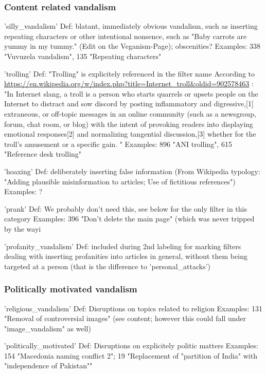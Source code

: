 \subsubsection{Content related vandalism}

'silly\_vandalism'
  Def: blatant, immediately obvious vandalism, such as inserting repeating characters or other intentional nonsence, such as "Baby carrots are yummy in my tummy." (Edit on the Veganism-Page); obscenities? %
  Examples: 338 "Vuvuzela vandalism", 135 "Repeating characters"

'trolling'
  Def: "Trolling" is explicitely referenced in the filter name %
  According to \url{https://en.wikipedia.org/w/index.php?title=Internet_troll&oldid=902578463} :
  "In Internet slang, a troll is a person who starts quarrels or upsets people on the Internet to distract and sow discord by posting inflammatory and digressive,[1] extraneous, or off-topic messages in an online community (such as a newsgroup, forum, chat room, or blog) with the intent of provoking readers into displaying emotional responses[2] and normalizing tangential discussion,[3] whether for the troll's amusement or a specific gain. "
  Examples: 896 "ANI trolling", 615 "Reference desk trolling"

'hoaxing'
  Def: deliberately inserting false information (From Wikipedia typology: "Adding plausible misinformation to articles; Use of fictitious references")
  Examples: ?

'prank'
  Def: We probably don't need this, see below for the only filter in this category
  Examples: 396 "Don't delete the main page" (which was never tripped by the way^^)

'profanity\_vandalism'
  Def: included during 2nd labeling for marking filters dealing with inserting profanities into articles in general, without them being targeted at a person (that is the difference to 'personal\_attacks')

\subsubsection{Politically motivated vandalism}
'religious\_vandalism'
Def: Disruptions on topics related to religion
Examples: 131 "Removal of controversial images" (see content; however this could fall under "image\_vandalism" as well)

'politically\_motivated'
Def: Disruptions on explicitely politic matters
Examples: 154 "Macedonia naming conflict 2"; 19 "Replacement of "partition of India" with "independence of Pakistan""

